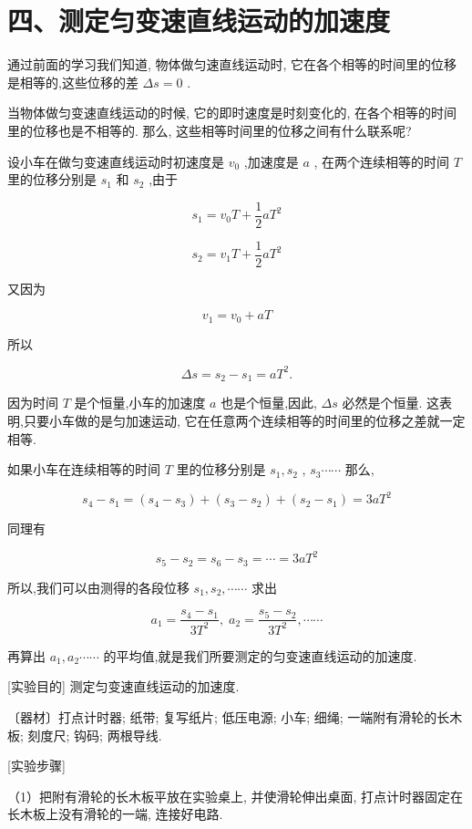 \documentclass[10pt]{article}
\begin{document}
\section*{四、测定匀变速直线运动的加速度}

通过前面的学习我们知道, 物体做匀速直线运动时, 它在各个相等的时间里的位移是相等的,这些位移的差 \({\Delta s} = 0\) .

当物体做匀变速直线运动的时候, 它的即时速度是时刻变化的, 在各个相等的时间里的位移也是不相等的. 那么, 这些相等时间里的位移之间有什么联系呢?

设小车在做匀变速直线运动时初速度是 \({v}_{0}\) ,加速度是 \(a\) , 在两个连续相等的时间 \(T\) 里的位移分别是 \({s}_{1}\) 和 \({s}_{2}\) ,由于

\[
{s}_{1} = {v}_{0}T + \frac{1}{2}a{T}^{2}
\]

\[
{s}_{2} = {v}_{1}T + \frac{1}{2}a{T}^{2}
\]

又因为

\[
{v}_{1} = {v}_{0} + {aT}
\]

所以

\[
{\Delta s} = {s}_{2} - {s}_{1} = a{T}^{2}.
\]

因为时间 \(T\) 是个恒量,小车的加速度 \(a\) 也是个恒量,因此, \({\Delta s}\) 必然是个恒量. 这表明,只要小车做的是匀加速运动, 它在任意两个连续相等的时间里的位移之差就一定相等.

如果小车在连续相等的时间 \(T\) 里的位移分别是 \({s}_{1},{s}_{2}\) , \({s}_{3}\cdots \cdots\) 那么,

\[
{s}_{4} - {s}_{1} = \left( {{s}_{4} - {s}_{3}}\right) + \left( {{s}_{3} - {s}_{2}}\right) + \left( {{s}_{2} - {s}_{1}}\right) = {3a}{T}^{2}
\]

同理有

\[
{s}_{5} - {s}_{2} = {s}_{6} - {s}_{3} = \cdots = {3a}{T}^{2}
\]

所以,我们可以由测得的各段位移 \({s}_{1},{s}_{2},\cdots \cdots\) 求出

\[
{a}_{1} = \frac{{s}_{4} - {s}_{1}}{3{T}^{2}},\;{a}_{2} = \frac{{s}_{5} - {s}_{2}}{3{T}^{2}},\cdots \cdots
\]

再算出 \({a}_{1},{a}_{2}\cdots \cdots\) 的平均值,就是我们所要测定的匀变速直线运动的加速度.

[实验目的] 测定匀变速直线运动的加速度.

〔器材〕打点计时器; 纸带; 复写纸片; 低压电源; 小车; 细绳; 一端附有滑轮的长木板; 刻度尺; 钩码; 两根导线.

[实验步骤]

（1）把附有滑轮的长木板平放在实验桌上, 并使滑轮伸出桌面, 打点计时器固定在长木板上没有滑轮的一端, 连接好电路.
\end{document}
